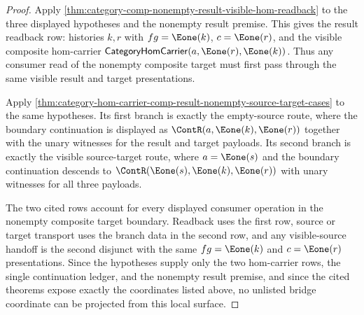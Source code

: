 \begin{proof}
Apply \autoref{thm:category-comp-nonempty-result-visible-hom-readback} to the
three displayed hypotheses and the nonempty result premise. This gives the
result readback row: histories $k,r$ with $fg=\Eone(k)$, $c=\Eone(r)$, and the
visible composite hom-carrier
$\mathsf{CategoryHomCarrier}(a,\Eone(r),\Eone(k))$. Thus any consumer read of
the nonempty composite target must first pass through the same visible result
and target presentations.

Apply \autoref{thm:category-hom-carrier-comp-result-nonempty-source-target-cases}
to the same hypotheses. Its first branch is exactly the empty-source route,
where the boundary continuation is displayed as
$\ContR(a,\Eone(k),\Eone(r))$ together with the unary witnesses for the result
and target payloads. Its second branch is exactly the visible source-target
route, where $a=\Eone(s)$ and the boundary continuation descends to
$\ContR(\Eone(s),\Eone(k),\Eone(r))$ with unary witnesses for all three
payloads.

The two cited rows account for every displayed consumer operation in the
nonempty composite target boundary. Readback uses the first row, source or
target transport uses the branch data in the second row, and any visible-source
handoff is the second disjunct with the same $fg=\Eone(k)$ and $c=\Eone(r)$
presentations. Since the hypotheses supply only the two hom-carrier rows, the
single continuation ledger, and the nonempty result premise, and since the
cited theorems expose exactly the coordinates listed above, no unlisted bridge
coordinate can be projected from this local surface.
\end{proof}

